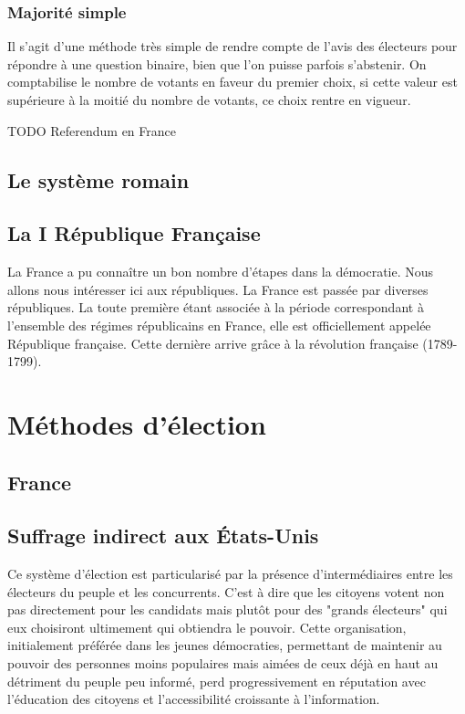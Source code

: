 \documentclass[12pt,a4paper]{report}
\begin{document}
\nocite{wiki:histdemo}
\subsection{Majorité simple} %
Il s'agit d'une méthode très simple de rendre compte de l'avis des électeurs pour répondre à une question binaire, bien que l'on puisse parfois s'abstenir.
On comptabilise le nombre de votants en faveur du premier choix, si cette valeur est supérieure à la moitié du nombre de votants, ce choix rentre en vigueur.


TODO Referendum en France

\section{Le système romain}

\section{La I République Française}
La France a pu connaître un bon nombre d’étapes dans la démocratie.
Nous allons nous intéresser ici aux républiques.
La France est passée par diverses républiques.
La toute première étant associée à la période correspondant à l'ensemble des régimes républicains en France, elle est officiellement appelée République française.
Cette dernière arrive grâce à la révolution française (1789-1799).


\chapter{Méthodes d'élection}
\section{France} %

\section{Suffrage indirect aux États-Unis}

Ce système d'élection est particularisé par la présence d'intermédiaires entre les électeurs du peuple et les concurrents. 
C'est à dire que les citoyens votent non pas directement pour les candidats mais plutôt pour des "grands électeurs" qui eux choisiront ultimement qui obtiendra le pouvoir.
Cette organisation, initialement préférée dans les jeunes démocraties, permettant de maintenir au pouvoir des personnes moins populaires mais aimées de ceux déjà en haut au détriment du peuple peu informé, perd progressivement en réputation avec l'éducation des citoyens et l'accessibilité croissante à l'information.
\nocite{wiki:scrutinindir}
\end{document}
